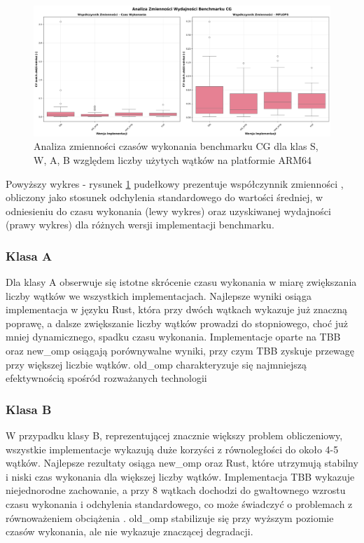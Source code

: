 \begin{figure}[H]
    \centering
    \includegraphics[width=\textwidth]{analiza/images/parallel/cg/arm/cg_analiza_zmiennosci.png}
    \caption{Analiza zmienności czasów wykonania benchmarku CG dla klas S, W, A, B względem liczby użytych wątków na platformie ARM64}
    \label{cg_analiza_zmiennosci}
\end{figure}
Powyższy wykres - rysunek \ref{cg_analiza_zmiennosci} pudełkowy prezentuje współczynnik zmienności , obliczony jako stosunek odchylenia standardowego do wartości średniej, w odniesieniu do czasu wykonania (lewy wykres) oraz uzyskiwanej wydajności (prawy wykres) dla różnych wersji implementacji benchmarku.

\subsubsection{Klasa A}
Dla klasy A obserwuje się istotne skrócenie czasu wykonania w miarę zwiększania liczby wątków we wszystkich implementacjach. Najlepsze wyniki osiąga implementacja w języku Rust, która przy dwóch wątkach wykazuje już znaczną poprawę, a dalsze zwiększanie liczby wątków prowadzi do stopniowego, choć już mniej dynamicznego, spadku czasu wykonania. Implementacje oparte na TBB oraz new\_omp osiągają porównywalne wyniki, przy czym TBB zyskuje przewagę przy większej liczbie wątków. old\_omp charakteryzuje się najmniejszą efektywnością spośród rozważanych technologii

\subsubsection{Klasa B}
W przypadku klasy B, reprezentującej znacznie większy problem obliczeniowy, wszystkie implementacje wykazują duże korzyści z równoległości do około 4-5 wątków. Najlepsze rezultaty osiąga new\_omp oraz Rust, które utrzymują stabilny i niski czas wykonania dla większej liczby wątków. Implementacja TBB wykazuje niejednorodne zachowanie, a przy 8 wątkach dochodzi do gwałtownego wzrostu czasu wykonania i odchylenia standardowego, co może świadczyć o problemach z równoważeniem obciążenia . old\_omp stabilizuje się przy wyższym poziomie czasów wykonania, ale nie wykazuje znaczącej degradacji.

